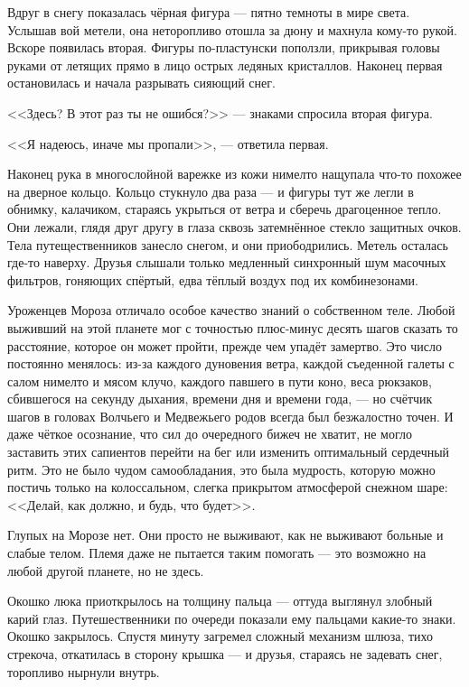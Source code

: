 Вдруг в снегу показалась чёрная фигура --- пятно темноты в мире света.
Услышав вой метели, она неторопливо отошла за дюну и махнула кому-то рукой.
Вскоре появилась вторая.
Фигуры по-пластунски поползли, прикрывая головы руками от летящих прямо в лицо острых ледяных кристаллов.
Наконец первая остановилась и начала разрывать сияющий снег.

<<Здесь? В этот раз ты не ошибся?>> --- знаками спросила вторая фигура.

<<Я надеюсь, иначе мы пропали>>, --- ответила первая.

Наконец рука в многослойной варежке из кожи нимелто нащупала что-то похожее на дверное кольцо.
Кольцо стукнуло два раза --- и фигуры тут же легли в обнимку, калачиком, стараясь укрыться от ветра и сберечь драгоценное тепло.
Они лежали, глядя друг другу в глаза сквозь затемнённое стекло защитных очков.
Тела путещественников занесло снегом, и они приободрились.
Метель осталась где-то наверху.
Друзья слышали только медленный синхронный шум масочных фильтров, гоняющих спёртый, едва тёплый воздух под их комбинезонами.

Уроженцев Мороза отличало особое качество знаний о собственном теле.
Любой выживший на этой планете мог с точностью плюс-минус десять шагов сказать то расстояние, которое он может пройти, прежде чем упадёт замертво.
Это число постоянно менялось: из-за каждого дуновения ветра, каждой съеденной галеты с салом нимелто и мясом клучо, каждого павшего в пути коно, веса рюкзаков, сбившегося на секунду дыхания, времени дня и времени года, --- но счётчик шагов в головах Волчьего и Медвежьего родов всегда был безжалостно точен.
И даже чёткое осознание, что сил до очередного бижеч не хватит, не могло заставить этих сапиентов перейти на бег или изменить оптимальный сердечный ритм.
Это не было чудом самообладания, это была мудрость, которую можно постичь только на колоссальном, слегка прикрытом атмосферой снежном шаре: <<Делай, как должно, и будь, что будет>>.

Глупых на Морозе нет.
Они просто не выживают, как не выживают больные и слабые телом.
Племя даже не пытается таким помогать --- это возможно на любой другой планете, но не здесь.

Окошко люка приоткрылось на толщину пальца --- оттуда выглянул злобный карий глаз.
Путешественники по очереди показали ему пальцами какие-то знаки.
Окошко закрылось.
Спустя минуту загремел сложный механизм шлюза, тихо стрекоча, откатилась в сторону крышка --- и друзья, стараясь не задевать снег, торопливо нырнули внутрь.

